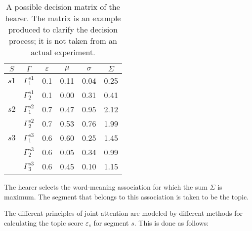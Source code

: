 \begin{table}
\begin{center}
\begin{tabular}{||c|c|c|c|c|c||}
\hline \hline
$S$ & $\Gamma$ & $\varepsilon$ & $\mu$ & $\sigma$ & $\Sigma$\\
\hline \hline
$s1$ & $\Gamma^{s1}_1$ & 0.1 & 0.11 & 0.04 & 0.25\\
\cline{2-6}
& $\Gamma^{s1}_2$ & 0.1 & 0.00 & 0.31 & 0.41\\
\hline
$s2$ & $\Gamma^{s2}_1$ & 0.7 & 0.47 & 0.95 & 2.12\\
\cline{2-6}
& $\Gamma^{s2}_2$ & 0.7 & 0.53 & 0.76 & 1.99\\
\hline
$s3$ & $\Gamma^{s3}_1$ & 0.6 & 0.60 & 0.25 & 1.45\\
\cline{2-6}
& $\Gamma^{s3}_2$ & 0.6 & 0.05 & 0.34 & 0.99\\
\cline{2-6}
& $\Gamma^{s3}_3$ & 0.6 & 0.45 & 0.10 & 1.15\\
\hline \hline
\end{tabular}
\caption{A possible decision matrix of the hearer. The matrix is an example produced to clarify the decision process; it is not taken from an actual experiment.}
\label{t:matrix}
\end{center}
\end{table}

The hearer selects the word-meaning association for which the sum $\Sigma$ is maximum. The segment that belongs to this association is taken to be the topic.

The different principles of joint attention are modeled by different methods for calculating the topic score $\varepsilon_s$ for segment $s$. This is done as follows:

